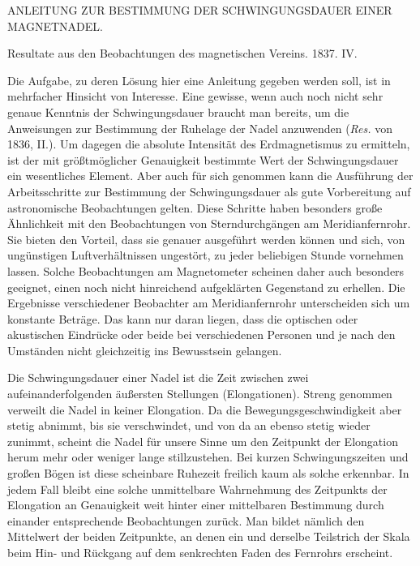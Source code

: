 \clearpage
{}
\begin{center}
{\large ANLEITUNG ZUR BESTIMMUNG DER SCHWINGUNGSDAUER EINER MAGNETNADEL.}
\par\medskip
Resultate aus den Beobachtungen des magnetischen Vereins. 1837. IV.
\end{center}

Die Aufgabe, zu deren Lösung hier eine Anleitung gegeben werden soll, ist in mehrfacher Hinsicht von Interesse. Eine gewisse, wenn auch noch nicht sehr genaue Kenntnis der Schwingungsdauer braucht man bereits, um die Anweisungen zur Bestimmung der Ruhelage der Nadel anzuwenden (\textit{Res.} von 1836, II.). Um dagegen die absolute Intensität des Erdmagnetismus zu ermitteln, ist der mit größtmöglicher Genauigkeit bestimmte Wert der Schwingungsdauer ein wesentliches Element. Aber auch für sich genommen kann die Ausführung der Arbeitsschritte zur Bestimmung der Schwingungsdauer als gute Vorbereitung auf astronomische Beobachtungen gelten. Diese Schritte haben besonders große Ähnlichkeit mit den Beobachtungen von Sterndurchgängen am Meridianfernrohr. Sie bieten den Vorteil, dass sie genauer ausgeführt werden können und sich, von ungünstigen Luftverhältnissen ungestört, zu jeder beliebigen Stunde vornehmen lassen. Solche Beobachtungen am Magnetometer scheinen daher auch besonders geeignet, einen noch nicht hinreichend aufgeklärten Gegenstand zu erhellen. Die Ergebnisse verschiedener Beobachter am Meridianfernrohr unterscheiden sich um konstante Beträge. Das kann nur daran liegen, dass die optischen oder akustischen Eindrücke oder beide bei verschiedenen Personen und je nach den Umständen nicht gleichzeitig ins Bewusstsein gelangen.

Die Schwingungsdauer einer Nadel ist die Zeit zwischen zwei aufeinanderfolgenden äußersten Stellungen (Elongationen). Streng genommen verweilt die Nadel in keiner Elongation. Da die Bewegungsgeschwindigkeit aber stetig abnimmt, bis sie verschwindet, und von da an ebenso stetig wieder zunimmt, scheint die Nadel für unsere Sinne um den Zeitpunkt der Elongation herum mehr oder weniger lange stillzustehen. Bei kurzen Schwingungszeiten und großen Bögen ist diese scheinbare Ruhezeit freilich kaum als solche erkennbar. In jedem Fall bleibt eine solche unmittelbare Wahrnehmung des Zeitpunkts der Elongation an Genauigkeit weit hinter einer mittelbaren Bestimmung durch einander entsprechende Beobachtungen zurück. Man bildet nämlich den Mittelwert der beiden Zeitpunkte, an denen ein und derselbe Teilstrich der Skala beim Hin- und Rückgang auf dem senkrechten Faden des Fernrohrs erscheint.

